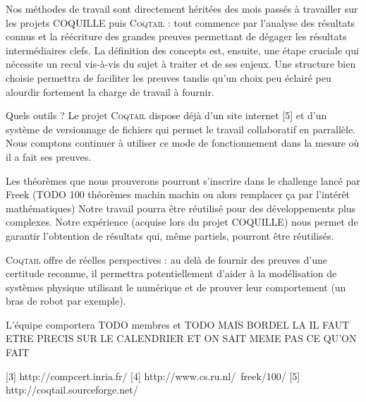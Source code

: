 \documentclass[11pt]{article}
\newcommand{\coqtail}{\textsc{Coqtail}}
\begin{document}
Nos méthodes de travail sont directement héritées des mois passés à travailler sur les projets COQUILLE puis \coqtail{} : tout commence par l'analyse des résultats connus et la réécriture des grandes preuves permettant de dégager les résultats intermédiaires clefs. La définition des concepts est, ensuite, une étape cruciale qui nécessite un recul vis-à-vis du sujet à traiter et de ses enjeux. Une structure bien choisie permettra de faciliter les preuves tandis qu'un choix peu éclairé peu alourdir fortement la charge de travail à fournir.

Quels outils ?
Le projet \coqtail{} dispose déjà d'un site internet [5] et d'un système de versionnage de fichiers qui permet le travail collaboratif en parrallèle. Nous comptons continuer à utiliser ce mode de fonctionnement dans la mesure où il a fait ses preuves.


Les théorèmes que nous prouverons pourront s'inscrire dans le challenge lancé par Freek (TODO 100 théorèmes machin machin ou alors remplacer ça par l'intérêt mathématiques) Notre travail pourra être réutilisé pour des développements plus complexes. Notre expérience (acquise lors du projet COQUILLE) nous permet de garantir l'obtention de résultats qui, même partiels, pourront être réutilisés.


\coqtail{} offre de réelles perspectives : au delà de fournir des preuves d'une certitude reconnue, %
il permettra potentiellement d'aider à la modélisation de systèmes physique utilisant le numérique et de prouver leur comportement (un bras de robot par exemple). %

L'équipe comportera TODO membres et TODO MAIS BORDEL LA IL FAUT ETRE PRECIS SUR LE CALENDRIER ET ON SAIT MEME PAS CE QU'ON FAIT

[3] http://compcert.inria.fr/
[4] http://www.cs.ru.nl/~freek/100/
[5] http://coqtail.sourceforge.net/



 
\end{document}
